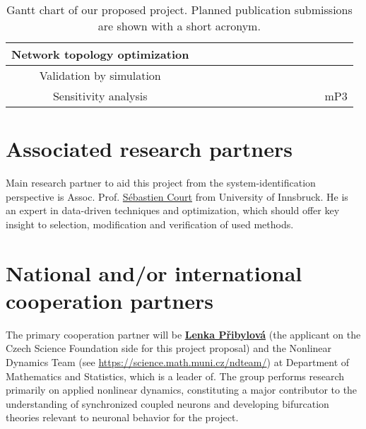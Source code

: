 \documentclass[a4paper,11pt]{scrartcl}
\begin{document}
\begin{table}[h!]
\begin{tabular}{|c|c|c|c|c|c|c|c|c|c|c|c|c|}
        \hline
        Network topology optimization & \cellcolor{yellow!25} & \cellcolor{yellow!25} & \cellcolor{yellow!25} & & \cellcolor{yellow!25} & \cellcolor{yellow!25} & \cellcolor{yellow!25} & & & & & \\
        \hline
        Validation by simulation & & & \cellcolor{yellow!25} & \cellcolor{yellow!25} & \cellcolor{yellow!25} & & \cellcolor{yellow!25} & \cellcolor{yellow!25} & \cellcolor{yellow!25} & & & \\
        \hline
        Sensitivity analysis & & & & \cellcolor{yellow!25} & \cellcolor{yellow!25} & & & & \cellcolor{yellow!25} & \cellcolor{yellow!25} & \cellcolor{yellow!25} & \cellcolor{yellow!25} mP3 \\
        \hline
    \end{tabular}
\caption{Gantt chart of our proposed project. Planned publication submissions are shown with a short acronym.}    
\label{tab:Gantt}
\end{table}


\section{Associated research partners}\label{sec:partners}

Main research partner to aid this project from the system-identification perspective is Assoc. Prof. \href{https://orcid.org/0000-0003-0005-5223}{Sébastien Court} from University of Innsbruck. He is an expert in data-driven techniques and optimization, which should offer key insight to selection, modification and verification of used methods.

\section{National and/or international cooperation partners}\label{sec:cooperations}

The primary cooperation partner will be \textbf{\href{https://orcid.org/0000-0002-9027-4333}{Lenka Přibylová}}  (the applicant on the Czech Science Foundation side for this project proposal) and the Nonlinear Dynamics Team (see \url{https://science.math.muni.cz/ndteam/}) at Department of Mathematics and Statistics, which is a leader of. The group performs research primarily on applied nonlinear dynamics, constituting a major contributor to the understanding of synchronized coupled neurons and developing bifurcation theories relevant to neuronal behavior for the project.
\end{document}
